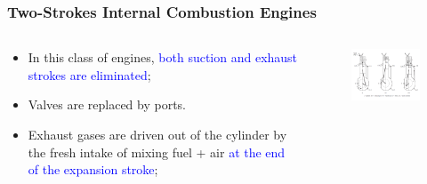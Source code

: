 \documentclass[10pt,compress]{beamer}
\begin{document}
\begin{frame}
 \frametitle{Two-Strokes Internal Combustion Engines}
  \begin{columns}
   \begin{column}[c]{0.4\linewidth}
    \begin{itemize}
     \item <1-> In this class of engines, \textcolor{blue}{both suction and exhaust strokes are eliminated};
     \item <2-> Valves are replaced by ports. 
     \item <3-> Exhaust gases are driven out of the cylinder by the fresh intake of mixing fuel + air \textcolor{blue}{at the end of the expansion stroke};
    \end{itemize}
   \end{column}
   \begin{column}[c]{0.6\linewidth}
    \begin{figure}%
     \begin{center}
      \includegraphics[width=7.5cm,clip]{./Pics/InternalCombustion_2Strokes_Otto}
     \end{center}
    \end{figure}  
   \end{column}  
  \end{columns}
\end{frame}
\end{document}
